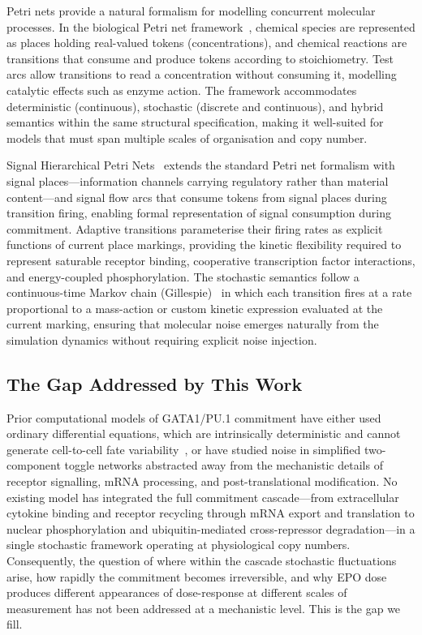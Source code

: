 Petri nets provide a natural formalism for modelling concurrent molecular processes. In the biological Petri net framework~\cite{heiner2008}, chemical species are represented as places holding real-valued tokens (concentrations), and chemical reactions are transitions that consume and produce tokens according to stoichiometry. Test arcs allow transitions to read a concentration without consuming it, modelling catalytic effects such as enzyme action. The framework accommodates deterministic (continuous), stochastic (discrete and continuous), and hybrid semantics within the same structural specification, making it well-suited for models that must span multiple scales of organisation and copy number.

Signal Hierarchical Petri Nets~\cite{shypn2026} extends the standard Petri net formalism with signal places---information channels carrying regulatory rather than material content---and signal flow arcs that consume tokens from signal places during transition firing, enabling formal representation of signal consumption during commitment. Adaptive transitions parameterise their firing rates as explicit functions of current place markings, providing the kinetic flexibility required to represent saturable receptor binding, cooperative transcription factor interactions, and energy-coupled phosphorylation. The stochastic semantics follow a continuous-time Markov chain (Gillespie)~\cite{gillespie1977} in which each transition fires at a rate proportional to a mass-action or custom kinetic expression evaluated at the current marking, ensuring that molecular noise emerges naturally from the simulation dynamics without requiring explicit noise injection.

\subsection{The Gap Addressed by This Work}

Prior computational models of GATA1/PU.1 commitment have either used ordinary differential equations, which are intrinsically deterministic and cannot generate cell-to-cell fate variability~\cite{huang2007,chickarmane2009}, or have studied noise in simplified two-component toggle networks abstracted away from the mechanistic details of receptor signalling, mRNA processing, and post-translational modification. No existing model has integrated the full commitment cascade---from extracellular cytokine binding and receptor recycling through mRNA export and translation to nuclear phosphorylation and ubiquitin-mediated cross-repressor degradation---in a single stochastic framework operating at physiological copy numbers. Consequently, the question of where within the cascade stochastic fluctuations arise, how rapidly the commitment becomes irreversible, and why EPO dose produces different appearances of dose-response at different scales of measurement has not been addressed at a mechanistic level. This is the gap we fill.
